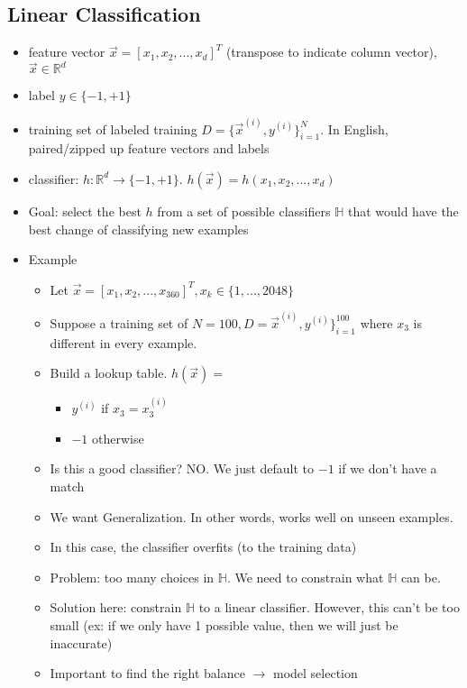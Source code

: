 \documentclass[10pt, oneside]{article}
\newcommand{\R}{\mathbb{R}}
\begin{document}
\subsection{Linear Classification}
\begin{itemize}
    \item feature vector $\vec{x} = [x_1,x_2,...,x_d]^T$ (transpose to indicate column vector), $\vec{x} \in \R^d$
    \item label $y\in \{-1,+1\}$
    \item training set of labeled training $D=\{\vec{x}^{(i)}, y^{(i)}\}^N _{i=1}$. In English, paired/zipped up feature vectors and labels
    \item classifier: $h:\R^d \rightarrow \{-1, +1\}$. $h(\vec{x}) = h(x_1, x_2,...,x_d)$
    \item Goal: select the best $h$ from a set of possible classifiers $\mathbb{H}$ that would have the best change of classifying new examples
    \item Example
    \begin{itemize}
        \item Let $\vec{x} = [x_1, x_2, ..., x_{360}]^T, x_k \in \{1,...,2048\}$
        \item Suppose a training set of $N=100, D= {\vec{x} ^(i) , y^{(i)}}\} ^{100} _ {i=1}$ where $x_3$ is different in every example.
        \item Build a lookup table.
        $h(\vec{x}) =$
        \begin{itemize}
            \item $y^{(i)}$ if $x_3 = x_3 ^{(i)}$
            \item $-1$ otherwise
        \end{itemize}
        \item Is this a good classifier? NO. We just default to $-1$ if we don't have a match
        \item We want Generalization. In other words, works well on unseen examples.
        \item In this case, the classifier overfits (to the training data)
        \item Problem: too many choices in $\mathbb{H}$. We need to constrain what $\mathbb{H}$ can be.
        \item Solution here: constrain $\mathbb{H}$ to a linear classifier. However, this can't be too small (ex: if we only have 1 possible value, then we will just be inaccurate)
        \item Important to find the right balance $\rightarrow$ model selection


\end{itemize}
\end{itemize}
\end{document}
